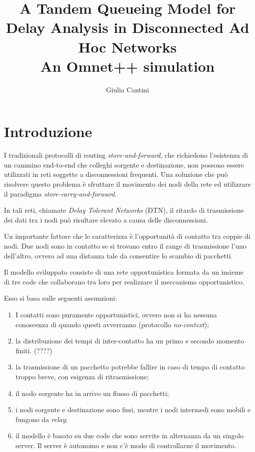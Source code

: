 \documentclass[a4paper,11pt]{article}
\begin{document}
\author{Giulia Cantini}
\title{A Tandem Queueing Model for Delay Analysis in Disconnected Ad Hoc Networks\\
\vspace{0.5cm}
\Large{An Omnet++ simulation}}
\maketitle

\tableofcontents

\section{Introduzione}
I tradizionali protocolli di routing \textit{store-and-forward}, che richiedono l'esistenza di un cammino
end-to-end che colleghi sorgente e destinazione, non possono essere utilizzati in reti
soggette a disconnessioni frequenti. Una soluzione che può risolvere questo problema è
sfruttare il movimento dei nodi della rete ed utilizzare il paradigma \textit{store-carry-and-forward}.

In tali reti, chiamate \textit{Delay Tolerant Networks} (DTN), il ritardo di trasmissione dei dati tra i nodi
può risultare elevato a causa delle disconnessioni.

Un importante fattore che le caratterizza è l'opportunità di contatto tra coppie di nodi.
Due nodi sono in contatto se si trovano entro il range di trasmissione l'uno dell'altro,
ovvero ad una distanza tale da consentire lo scambio di pacchetti.

Il modello sviluppato consiste di una rete opportunistica formata da un insieme di tre code
che collaborano tra loro per realizzare il meccanismo opportunistico.

Esso si basa sulle seguenti assunzioni:

\begin{enumerate}
  \item I contatti sono puramente opportunistici, ovvero non si ha nessuna conoscenza
  di quando questi avverranno (protocollo \textit{no-context});
  \item la distribuzione dei tempi di inter-contatto ha un primo e secondo momento
  finiti. (????)
  \item la trasmissione di un pacchetto potrebbe fallire in caso di tempo di contatto
  troppo breve, con esigenza di ritrasmissione;
  \item il nodo sorgente ha in arrivo un flusso di pacchetti;
  \item i nodi sorgente e destinazione sono fissi, mentre i nodi intermedi sono mobili e
  fungono da \textit{relay};
  \item il modello è basato su due code che sono servite in alternanza da un singolo server.
  Il server è autonomo e non c'è modo di controllarne il movimento.

\end{enumerate}
\end{document}
